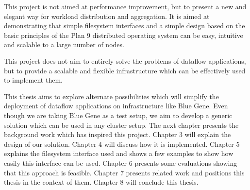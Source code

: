 This project is not aimed at performance improvement, but to present a new and elegant way for
workload distribution and aggregation.  It is aimed at demonstrating that simple filesystem interfaces
and a simple design based on the basic principles of the Plan 9 distributed operating system can be
easy, intuitive and scalable to a large number of nodes.

This project does not aim to entirely solve the problems of dataflow applications, 
but to provide a scalable and flexible infrastructure which can be effectively used to implement them.


This thesis aims to explore alternate possibilities which will simplify the deployment
of dataflow applications on infrastructure like Blue Gene.  Even though we are taking
Blue Gene as a test setup, we aim to develop a generic solution which can be used in any
cluster setup.  The next chapter presents the background work which has inspired this project.  
Chapter 3 will explain the design of our solution.  Chapter 4 will discuss how it is implemented.
Chapter 5 explains the filesystem interface used and shows a few examples to show how easily this
interface can be used.
Chapter 6 presents some evaluations showing that this approach is feasible. Chapter 7 presents
related work and positions this thesis in the context of them.  Chapter 8 will conclude this thesis. 



